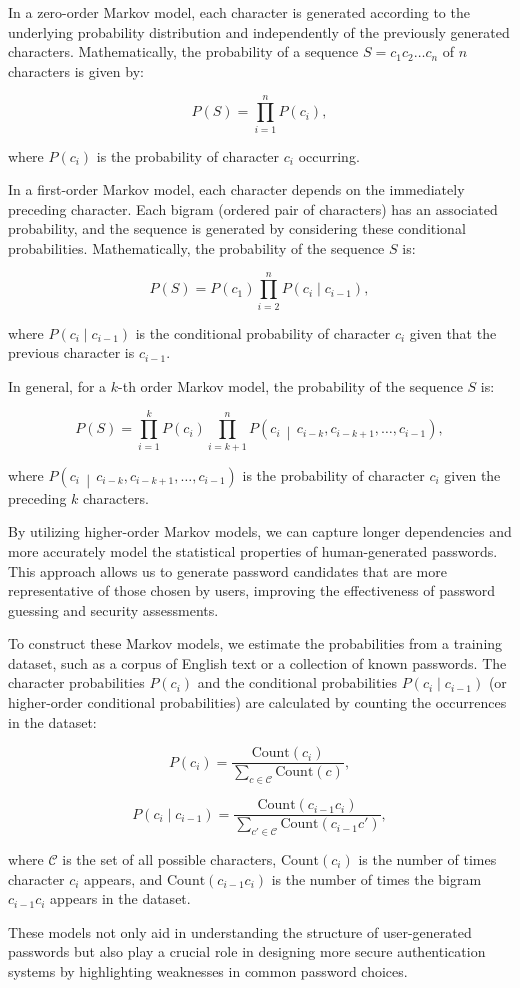 In a zero-order Markov model, each character is generated according to the underlying probability distribution and independently of the previously generated characters. Mathematically, the probability of a sequence $S = c_1 c_2 \ldots c_n$ of $n$ characters is given by:

\[
P(S) = \prod_{i=1}^{n} P(c_i),
\]

where $P(c_i)$ is the probability of character $c_i$ occurring.

In a first-order Markov model, each character depends on the immediately preceding character. Each bigram (ordered pair of characters) has an associated probability, and the sequence is generated by considering these conditional probabilities. Mathematically, the probability of the sequence $S$ is:

\[
P(S) = P(c_1) \prod_{i=2}^{n} P(c_i \mid c_{i-1}),
\]

where $P(c_i \mid c_{i-1})$ is the conditional probability of character $c_i$ given that the previous character is $c_{i-1}$.

In general, for a $k$-th order Markov model, the probability of the sequence $S$ is:

\[
P(S) = \prod_{i=1}^{k} P(c_i) \prod_{i=k+1}^{n} P\left(c_i \,\middle|\, c_{i-k}, c_{i-k+1}, \ldots, c_{i-1}\right),
\]

where $P\left(c_i \,\middle|\, c_{i-k}, c_{i-k+1}, \ldots, c_{i-1}\right)$ is the probability of character $c_i$ given the preceding $k$ characters.

By utilizing higher-order Markov models, we can capture longer dependencies and more accurately model the statistical properties of human-generated passwords. This approach allows us to generate password candidates that are more representative of those chosen by users, improving the effectiveness of password guessing and security assessments.

To construct these Markov models, we estimate the probabilities from a training dataset, such as a corpus of English text or a collection of known passwords. The character probabilities $P(c_i)$ and the conditional probabilities $P(c_i \mid c_{i-1})$ (or higher-order conditional probabilities) are calculated by counting the occurrences in the dataset:

\[
P(c_i) = \frac{\text{Count}(c_i)}{\sum_{c \in \mathcal{C}} \text{Count}(c)},
\]

\[
P(c_i \mid c_{i-1}) = \frac{\text{Count}(c_{i-1} c_i)}{\sum_{c' \in \mathcal{C}} \text{Count}(c_{i-1} c')},
\]

where $\mathcal{C}$ is the set of all possible characters, $\text{Count}(c_i)$ is the number of times character $c_i$ appears, and $\text{Count}(c_{i-1} c_i)$ is the number of times the bigram $c_{i-1} c_i$ appears in the dataset.

These models not only aid in understanding the structure of user-generated passwords but also play a crucial role in designing more secure authentication systems by highlighting weaknesses in common password choices.